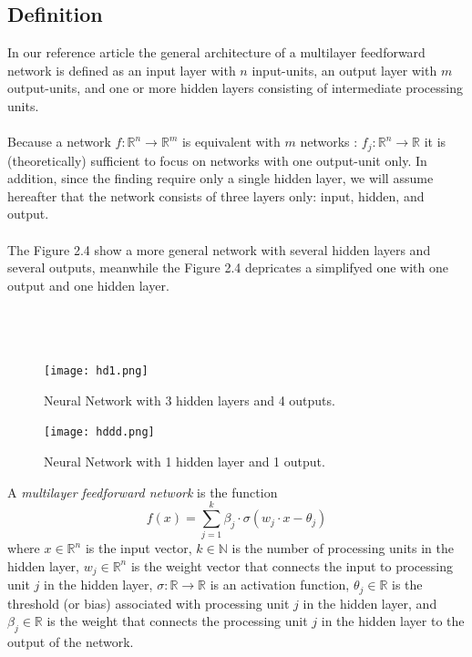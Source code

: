 \documentclass[../main.tex]{subfiles}
\begin{document}
	 \subsection{Definition}
	 \noindent  In our reference article \cite{leshno1993multilayer} the general architecture of a multilayer feedforward network is defined as an input layer with $n$ input-units, an output layer with $m$ output-units, and one or more hidden layers consisting of intermediate processing units. \\ \\ Because a network $f:\mathbb{R}^n \rightarrow \mathbb{R}^m$ is equivalent with $m$ networks :
	 $f_j: \mathbb{R}^n \rightarrow \mathbb{R}$ it is (theoretically) sufficient to focus on networks with one output-unit only. In addition, since the \cite{leshno1993multilayer} finding require only a single hidden layer, we will assume hereafter that the network consists of three layers only: input, hidden, and output. \\ \\
	 The Figure 2.4 show a more general network with several hidden layers and several outputs, meanwhile the Figure 2.4 depricates a simplifyed one with one output and one hidden layer. \\ \\\\\\
	 
	 
	 \begin{figure}[h]
	 	\begin{minipage}[t]{0.45\textwidth}
	 		\centering
	 		\texttt{[image: hd1.png]}
	 		\caption{Neural Network with 3 hidden layers and 4 outputs.}
	 		\label{fig:imagen1}
	 	\end{minipage}\hfill
	 	\begin{minipage}[t]{0.45\textwidth}
	 		\centering
	 		\texttt{[image: hddd.png]}
	 		\caption{Neural Network with 1 hidden layer and 1 output.}
	 		\label{fig:imagen2}
	 	\end{minipage}
	 \end{figure}
	 
	 \begin{definition} A \textit{multilayer feedforward network} is the function
	 	$$f(x)=\sum_{j=1}^k \beta_j \cdot \sigma(w_j \cdot x - \theta_j)$$
	 	where $x \in \mathbb{R}^n$ is the input vector, $k \in \mathbb{N}$ is the number of processing units in the hidden layer, $w_j \in \mathbb{R}^n$ is the weight vector that connects the input to processing unit $j$ in the hidden layer, $\sigma : \mathbb{R} \rightarrow \mathbb{R}$ is an activation function, $\theta_j \in \mathbb{R}$ is the threshold (or bias) associated with processing unit $j$ in the hidden layer, and $\beta_j \in \mathbb{R}$ is the weight that connects the processing unit $j$ in the hidden layer to the output of the network.
	 	
	 	
	 \end{definition}
\end{document}
